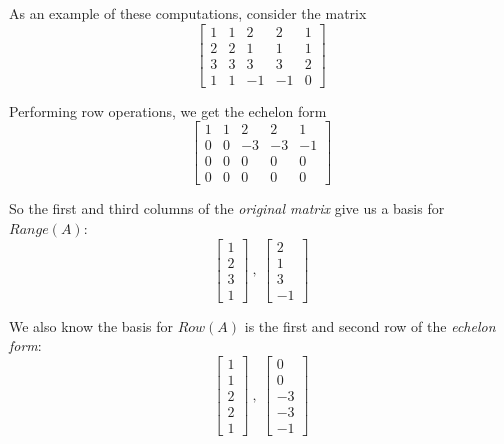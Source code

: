 As an example of these computations, consider the matrix 
$$\begin{bmatrix}
1 & 1 & 2 & 2 & 1 \\
2 & 2 & 1 & 1 & 1 \\
3 & 3 & 3 & 3 & 2 \\
1 & 1 & -1 & -1 & 0
\end{bmatrix}$$

Performing row operations, we get the echelon form 
$$\begin{bmatrix}
1 & 1 & 2 & 2 & 1 \\
0 & 0 & -3 & -3 & -1 \\
0 & 0 & 0 & 0 & 0 \\
0 & 0 & 0 & 0 & 0
\end{bmatrix}$$

So the first and third columns of the \textit{original matrix} give us a basis for $Range(A)$: 
$$\begin{bmatrix}
1 \\ 
2 \\
3 \\ 
1
\end{bmatrix}\ ,\  \begin{bmatrix}
2 \\ 
1 \\
3 \\
-1
\end{bmatrix}$$

We also know the basis for $Row(A)$ is the first and second row of the \textit{echelon form}:
$$\begin{bmatrix}
1 \\
1 \\
2 \\
2 \\
1
\end{bmatrix} \ , \ \begin{bmatrix}
0 \\
0 \\ 
-3 \\ 
-3 \\ 
-1
\end{bmatrix}$$

